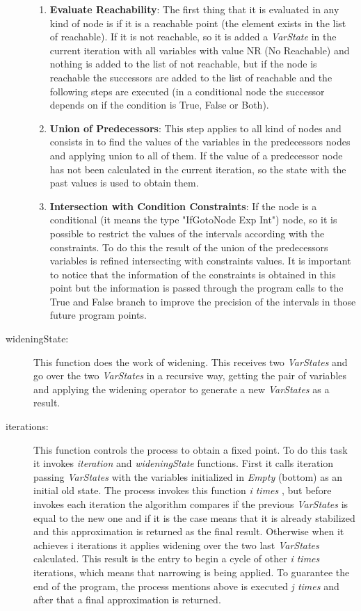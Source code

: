 \documentclass{article}
\begin{document}
\begin{description}
    \begin{enumerate}
      \item \textbf{Evaluate Reachability}: The first thing that it is evaluated in any kind of node is if it is a reachable point (the element exists in the list of reachable). If it is not reachable, so it is added a \emph{VarState} in the current iteration with all variables with value NR (No Reachable) and nothing is added to the list of not reachable, but if the node is reachable the successors  are added to the list of reachable and the following steps are executed (in a conditional node the successor depends on if the condition is True, False or Both).
      \item \textbf{Union of Predecessors}: This step applies to all kind of nodes and consists in to find the values of the variables in the predecessors nodes and applying union to all of them. If the value of a predecessor node has not been calculated in the current iteration, so the state with the past values is used to obtain them.
      \item \textbf{Intersection with Condition Constraints}: If the node is a conditional (it means the type "IfGotoNode Exp Int") node, so it is possible to restrict the values of the intervals according with the constraints. To do this the result of the union of the predecessors variables is refined intersecting with constraints values. It is important to notice that the information of the constraints is obtained in this point but the information is passed through the program calls to the True and False branch to improve the precision of the intervals in those future program points. 
      
    \end{enumerate}


  \item[wideningState:] This function does the work of widening. This receives two \emph{ VarStates } and
    go over the two \emph{ VarStates } in a recursive way, getting the pair of variables and applying
    the widening operator to generate a new \emph{ VarStates } as a result.

  \item[iterations:] This function controls the process to obtain a fixed point. To do this task it invokes \emph{ iteration } and  \emph{ wideningState } functions. First it calls iteration passing \emph{ VarStates } with the variables initialized in \emph{ Empty }(bottom) as an initial old state. The process invokes this function \emph{ i times }, but before invokes each iteration the algorithm compares if the previous \emph{ VarStates } is equal to the new one and if it is the case means that it is already stabilized and this approximation is returned as the final result. Otherwise when it achieves i iterations it applies widening over the two last  \emph{ VarStates } calculated. This result is the entry to begin a cycle of other \emph{ i times } iterations, which means that narrowing is being applied. To guarantee the end of the program, the process mentions above is executed \emph{ j times } and after that a final approximation is returned.


\end{description}
\end{document}
